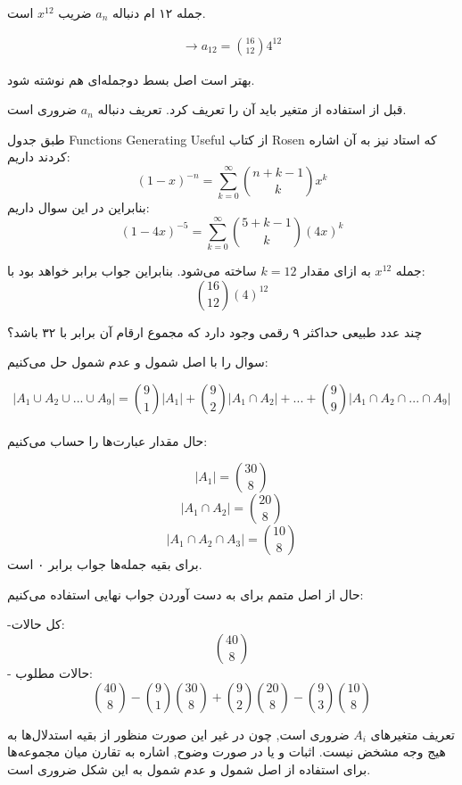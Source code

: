 \documentclass[11pt,largemargins]{h2wp}
\begin{document}
    جمله ۱۲ ام دنباله 
    $ a_n$
  ضریب 
  $ x ^ {12} $
  است.

\begin{align*}
  \longrightarrow a_{12} = \binom{16}{12} 4 ^ {12}
\end{align*}



\notes

بهتر است اصل بسط دوجمله‌ای هم نوشته شود.

قبل از استفاده از متغیر باید آن را تعریف کرد. تعریف دنباله $a_n$ ضروری است. 


طبق جدول
  Functions Generating Useful
از کتاب Rosen
که استاد نیز به آن اشاره کردند داریم:\\
$$(1 - x) ^ {-n} = \sum_{k = 0}^{\infty} \binom{n + k - 1}{k} x^{k} $$
  بنابراین در این سوال داریم:
$$(1 - 4x) ^ {-5} =
\sum_{k = 0}^{\infty} \binom{5 + k - 1}{k} (4x)^k $$

جمله $x^{12}$ به ازای مقدار $k = 12$ ساخته می‌شود. بنابراین جواب برابر خواهد بود با: 
$$\binom{16}{12} (4)^{12}$$


\question


چند عدد طبیعی حداکثر ۹ رقمی وجود دارد که مجموع ارقام آن برابر با ۳۲ باشد؟

\solution


  سوال را با اصل شمول و عدم شمول حل می‌کنیم: 
   
    \[|A_1\cup A_2\cup... \cup A_9|=\binom{9}{1}|A_1|+\binom{9}{2}|A_1\cap A_2|+...+\binom{9}{9}|A_1\cap A_2\cap...\cap A_9|\]\\
    حال مقدار عبارت‌ها را حساب می‌کنیم:
    
    \[|A_1|=\binom{30}{8}\]
    \[|A_1\cap A_2|=\binom{20}{8}\]
    \[|A_1\cap A_2\cap A_3|=\binom{10}{8}\]
    برای بقیه جمله‌ها جواب برابر ۰ است.
    
    حال از اصل متمم برای به دست آوردن جواب نهایی استفاده می‌کنیم:
    
        -کل حالات:
     \[\binom{40}{8}\]
          - حالات مطلوب:
     \[\binom{40}{8}- \binom{9}{1}\binom{30}{8}+\binom{9}{2}\binom{20}{8}-\binom{9}{3}\binom{10}{8}\]
     
\notes
{}
تعریف متغیر‌های $A_i$ ضروری است, چون در غیر این صورت منظور از بقیه استدلال‌ها به هیج وجه مشخض نیست.
اثبات و یا در صورت وضوح, اشاره به تقارن میان مجموعه‌ها برای استفاده از اصل شمول و عدم شمول به این شکل ضروری است.
\end{document}
